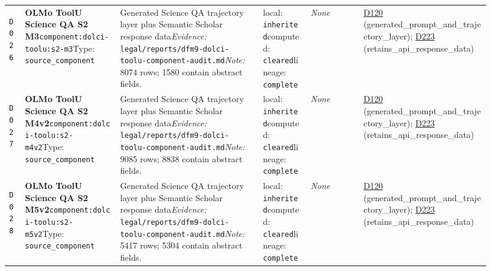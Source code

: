 \documentclass[9pt,a4paper]{article}
\newcommand{\depid}[1]{\hypertarget{dep:#1}{\texttt{#1}}}
\begin{document}
\begin{landscape}
\begin{longtable}{@{}L{0.035\linewidth}L{0.185\linewidth}L{0.27\linewidth}L{0.09\linewidth}L{0.10\linewidth}L{0.24\linewidth}@{}}
\depid{D026} & \textbf{OLMo ToolU Science QA S2 M3}\newline \nolinkurl{component:dolci-toolu:s2-m3}\newline Type: \texttt{source\_component} & Generated Science QA trajectory layer plus Semantic Scholar response data\newline \textit{Evidence:} \nolinkurl{legal/reports/dfm9-dolci-toolu-component-audit.md}\newline \textit{Note:} 8074 rows; 1580 contain abstract fields. & local: \texttt{inherited}\newline computed: \texttt{cleared}\newline lineage: \texttt{complete} & \textit{None} & \hyperlink{dep:D120}{D120} (generated\_prompt\_and\_trajectory\_layer); \hyperlink{dep:D223}{D223} (retains\_api\_response\_data) \\
\depid{D027} & \textbf{OLMo ToolU Science QA S2 M4v2}\newline \nolinkurl{component:dolci-toolu:s2-m4v2}\newline Type: \texttt{source\_component} & Generated Science QA trajectory layer plus Semantic Scholar response data\newline \textit{Evidence:} \nolinkurl{legal/reports/dfm9-dolci-toolu-component-audit.md}\newline \textit{Note:} 9085 rows; 8838 contain abstract fields. & local: \texttt{inherited}\newline computed: \texttt{cleared}\newline lineage: \texttt{complete} & \textit{None} & \hyperlink{dep:D120}{D120} (generated\_prompt\_and\_trajectory\_layer); \hyperlink{dep:D223}{D223} (retains\_api\_response\_data) \\
\depid{D028} & \textbf{OLMo ToolU Science QA S2 M5v2}\newline \nolinkurl{component:dolci-toolu:s2-m5v2}\newline Type: \texttt{source\_component} & Generated Science QA trajectory layer plus Semantic Scholar response data\newline \textit{Evidence:} \nolinkurl{legal/reports/dfm9-dolci-toolu-component-audit.md}\newline \textit{Note:} 5417 rows; 5304 contain abstract fields. & local: \texttt{inherited}\newline computed: \texttt{cleared}\newline lineage: \texttt{complete} & \textit{None} & \hyperlink{dep:D120}{D120} (generated\_prompt\_and\_trajectory\_layer); \hyperlink{dep:D223}{D223} (retains\_api\_response\_data) \\

\end{longtable}
\end{landscape}
\end{document}
